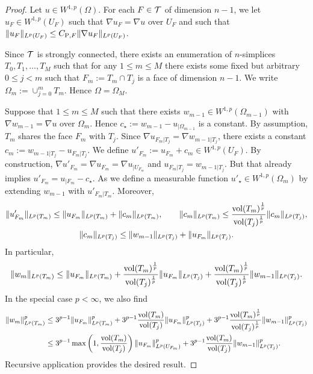 \documentclass[a4paper]{amsart}
\begin{document}
\begin{proof}
 Let $u \in W^{1,p}(\Omega)$. 
 For each $F \in {\mathcal T}$ of dimension $n-1$, 
 we let $u_F \in W^{1,p}(U_F)$ such that $\nabla u_F = \nabla u$ over $U_F$ and such that $\| u_F \|_{L^{p}(U_F)} \leq C_{{\rm{P}},F} \| \nabla u_F \|_{L^{p}(U_F)}$.
 
 Since ${\mathcal T}$ is strongly connected, there exists an enumeration of $n$-simplices $T_0, T_1, \dots, T_M$ such that for any $1 \leq m \leq M$ there exists some fixed but arbitrary $0 \leq j < m$ such that $F_m := T_m \cap T_j$ is a face of dimension $n-1$. We write $\Omega_m := \cup_{j=0}^{m} T_m$. Hence $\Omega = \Omega_M$. 
 
 
 
 Suppose that $1 \leq m \leq M$ such that there exists $w_{m-1} \in W^{1,p}(\Omega_{m-1})$ with $\nabla w_{m-1} = \nabla u$ over $\Omega_m$. Hence $c_{\star} := w_{m-1} - u_{|\Omega_{m-1}}$ is a constant. 
 By assumption, $T_{m}$ shares the face $F_{m}$ with $T_{j}$. 
 Since $\nabla u_{F_{m}|T_j} = \nabla w_{m-1|T_j}$,
 there exists a constant $c_{m} := w_{m-1|T_j} - u_{F_{m}|T_j}$.
 We define $u'_{F_m} := u_{F_m} + c_{m} \in W^{1,p}(U_F)$.
 By construction, $\nabla u'_{F_m} = \nabla u_{F_m} = \nabla u_{|U_{F_m}}$ and $u_{F_{m}|T_j} = w_{m-1|T_j}$. 
 But that already implies $u'_{F_m} = u_{|F_m} - c_{\star}$. 
 As we define a measurable function $u'_{\star} \in W^{1,p}(\Omega_m)$ by extending $w_{m-1}$ with $u'_{F_m|T_m}$.
 Moreover, 
 \begin{gather*}
    \| u'_{F_m} \|_{L^{p}(T_m)}
    \leq 
    \| u_{F_m} \|_{L^{p}(T_m)}
    +
    \| c_{m} \|_{L^{p}(T_m)},
    \qquad 
    \| c_{m} \|_{L^{p}(T_m)}
    \leq 
    \frac{ \operatorname{vol}(T_m)^{\frac 1 p} }{ \operatorname{vol}(T_j)^{\frac 1 p} }
    \| c_{m} \|_{L^{p}(T_j)},
    \\ 
    \| c_{m} \|_{L^{p}(T_j)}
    \leq 
    \| w_{m-1}\|_{L^{p}(T_j)} + \| u_{F_{m}} \|_{L^{p}(T_j)} 
    .
 \end{gather*}
 In particular,
 \begin{align*}
    \| w_{m} \|_{L^{p}(T_m)}
    \leq 
    \| u_{F_m} \|_{L^{p}(T_m)}
    +
    \frac{ \operatorname{vol}(T_m)^{\frac 1 p} }{ \operatorname{vol}(T_j)^{\frac 1 p} }
    \| u_{F_{m}} \|_{L^{p}(T_j)}
    +
    \frac{ \operatorname{vol}(T_m)^{\frac 1 p} }{ \operatorname{vol}(T_j)^{\frac 1 p} }
    \| w_{m-1}\|_{L^{p}(T_j)}
    .
 \end{align*}
 In the special case $p < \infty$, we also find 
 \begin{align*}
    \| w_{m} \|_{L^{p}(T_m)}^{p}
    &\leq 
    3^{p-1}
    \| u_{F_m} \|_{L^{p}(T_m)}^{p}
    +
    3^{p-1}
    \frac{ \operatorname{vol}(T_m) }{ \operatorname{vol}(T_j) }
    \| u_{F_{m}} \|_{L^{p}(T_j)}^{p}
    +
    3^{p-1}
    \frac{ \operatorname{vol}(T_m)^{\frac 1 p} }{ \operatorname{vol}(T_j)^{\frac 1 p} }
    \| w_{m-1}\|_{L^{p}(T_j)}^{p}
    \\&\leq 
    3^{p-1}
    \max\left( 1, \frac{ \operatorname{vol}(T_m) }{ \operatorname{vol}(T_j) } \right)
    \| u_{F_m} \|_{L^{p}(U_{F_m})}^{p}
    +
    3^{p-1}
    \frac{ \operatorname{vol}(T_m) }{ \operatorname{vol}(T_j) }
    \| w_{m-1}\|_{L^{p}(T_j)}^{p}
    .
 \end{align*}
 Recursive application provides the desired result. 
\end{proof}
\end{document}
